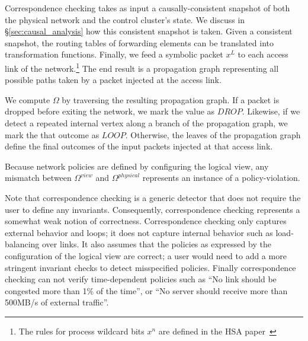 Correspondence checking takes as input a causally-consistent
snapshot of both the physical network and the
control cluster's state. We discuss in \S\ref{sec:causal_analysis} how this consistent snapshot
is taken. Given a consistent
snapshot, the routing
tables of forwarding elements can be translated into transformation functions.
Finally, we feed a symbolic packet $x^L$ to each access link of the
network.\footnote{The rules for process wildcard bits $x^n$ are defined in
the HSA paper~\cite{hsa}} The end result is a propagation graph representing all possible paths taken by a packet injected
at the access link.

We compute $\Omega$ by traversing the resulting propagation graph. If a packet
is dropped before exiting the network, we mark the value as $DROP$. Likewise,
if we detect a repeated internal vertex along a branch of the propagation graph, we mark the
that outcome as $LOOP$. Otherwise,
the leaves of the propagation graph define the final outcomes of the input
packets injected at that access link.

Because network policies are defined by
configuring the logical view, any mismatch between $\Omega^{view}$ and $\Omega^{physical}$
represents an instance of a policy-violation.

Note that correspondence checking is a generic detector that does not require the user
to define any invariants. Consequently, correspondence checking represents a somewhat weak notion of
correctness. Correspondence checking only captures external behavior and
loops; it does not capture internal behavior such as load-balancing
over links. It also assumes that the policies as expressed by the
configuration of the logical view are correct; a user would need to add a more
stringent invariant checks to detect misspecified policies.
Finally correspondence checking can not verify
time-dependent policies such as ``No link should be congested more than 1\% of
the time'', or ``No server should receive more than 500MB/s of external traffic''.


%
%
%
%
%
%

